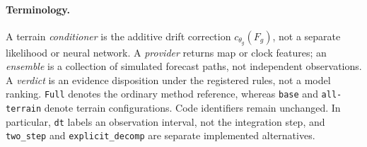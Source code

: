 \documentclass[11pt]{article}
\begin{document}
\paragraph{Terminology.}
A terrain \emph{conditioner} is the additive drift correction
\(c_{\theta_g}(F_g)\), not a separate likelihood or neural network.
A \emph{provider} returns map or clock features; an \emph{ensemble} is a
collection of simulated forecast paths, not independent observations.
A \emph{verdict} is an evidence disposition under the registered rules,
not a model ranking. \texttt{Full} denotes the ordinary method reference,
whereas \texttt{base} and \texttt{all-terrain} denote terrain configurations.
Code identifiers remain unchanged. In particular, \texttt{dt} labels an
observation interval, not the integration step, and \texttt{two\_step} and
\texttt{explicit\_decomp} are separate implemented alternatives.
\end{document}
